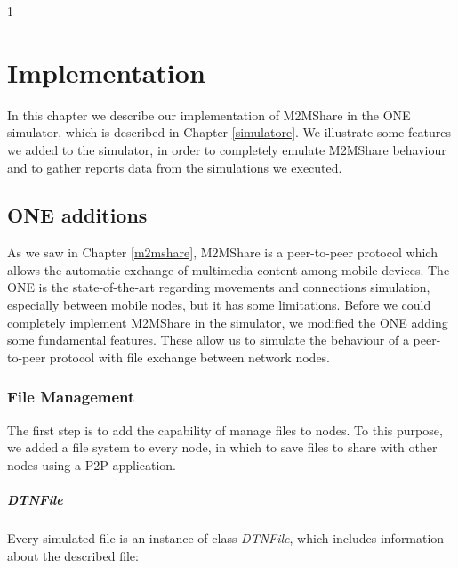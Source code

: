 
1\chapter{Implementation}\label{implementazione} %



\graphicspath{{6-implementazione/img/}}


In this chapter we describe our implementation of M2MShare in the ONE simulator, which is described in Chapter \ref{simulatore}. We illustrate some features we added to the simulator, in order to completely emulate M2MShare behaviour and to gather reports data from the simulations we executed.
  

\section{ONE additions}
As we saw in Chapter \ref{m2mshare}, M2MShare is a peer-to-peer protocol which allows the automatic exchange of multimedia content among mobile devices. The ONE is the state-of-the-art regarding movements and connections simulation, especially between mobile nodes, but it has some limitations. Before we could completely implement M2MShare in the simulator, we modified the ONE adding some fundamental features. These allow us to simulate the behaviour of a peer-to-peer protocol with file exchange between network nodes.


\subsection{File Management}
The first step is to add the capability of manage files to nodes. To this purpose, we added a file system to every node, in which to save files to share with other nodes using a P2P application. 


\paragraph{DTNFile}
Every simulated file is an instance of class \textit{DTNFile}, which includes information about the described file:

